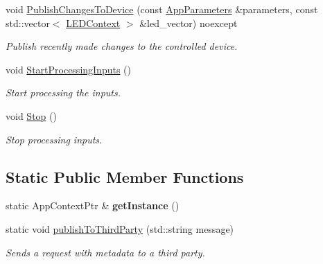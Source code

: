 \begin{DoxyCompactItemize}
void \hyperlink{classAppContext_a9db79afff28d55fdcff4194befb585c7}{Publish\+Changes\+To\+Device} (const \hyperlink{structAppParameters}{App\+Parameters} \&parameters, const std\+::vector$<$ \hyperlink{classLEDContext}{L\+E\+D\+Context} $>$ \&led\+\_\+vector) noexcept
\begin{DoxyCompactList}\small\item\em Publish recently made changes to the controlled device. \end{DoxyCompactList}\item 
\mbox{\label{classAppContext_a522fe0c95875b044bb1a8b30c20d589e}} 
void \hyperlink{classAppContext_a522fe0c95875b044bb1a8b30c20d589e}{Start\+Processing\+Inputs} ()
\begin{DoxyCompactList}\small\item\em Start processing the inputs. \end{DoxyCompactList}\item 
\mbox{\label{classAppContext_a2e618358872ff3844751f02a14bb81fb}} 
void \hyperlink{classAppContext_a2e618358872ff3844751f02a14bb81fb}{Stop} ()
\begin{DoxyCompactList}\small\item\em Stop processing inputs. \end{DoxyCompactList}\end{DoxyCompactItemize}
\subsection*{Static Public Member Functions}
\begin{DoxyCompactItemize}
\item 
\mbox{\label{classAppContext_a6a3fe5f796a107e125c3acaed0c8d540}} 
static App\+Context\+Ptr \& {\bfseries get\+Instance} ()
\item 
\mbox{\label{classAppContext_a4688a40ae16907f475d447e24ca1c1a0}} 
static void \hyperlink{classAppContext_a4688a40ae16907f475d447e24ca1c1a0}{publish\+To\+Third\+Party} (std\+::string message)
\begin{DoxyCompactList}\small\item\em Sends a request with metadata to a third party. \end{DoxyCompactList}\end{DoxyCompactItemize}


